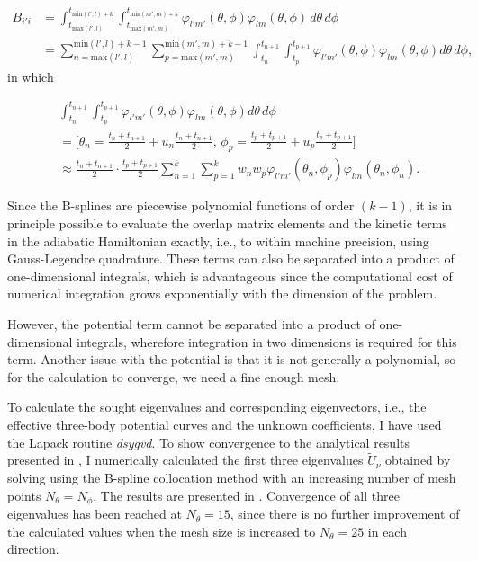 \begin{equation}
\begin{aligned}
B_{i'i} &= \int_{t_{\text{max}(l',l)}}^{t_{\text{min}(l',l)+k}} \int_{t_{\text{max}(m',m)}}^{t_{\text{min}(m',m)+k}} \varphi_{l'm'}(\theta,\phi)\varphi_{lm}(\theta,\phi)\,d\theta\,d\phi \\
&= \sum_{n={\text{max}(l',l)}}^{\text{min}(l',l)+k-1} \sum_{p={\text{max}(m',m)}}^{\text{min}(m',m)+k-1} \int_{t_{n}}^{t_{n+1}} \int_{t_{p}}^{t_{p+1}} \varphi_{l'm'}(\theta,\phi) \varphi_{lm}(\theta,\phi) d\theta\,d\phi,
\end{aligned}
\end{equation}
in which

\begin{equation}
\begin{aligned}
&\int_{t_{n}}^{t_{n+1}} \int_{t_{p}}^{t_{p+1}} \varphi_{l'm'}(\theta,\phi) \varphi_{lm}(\theta,\phi) d\theta\,d\phi\,\\
&=\bigg[\theta_n = \frac{t_n + t_{n+1}}{2} + u_n\frac{t_n + t_{n+1}}{2}, \, \phi_p = \frac{t_p + t_{p+1}}{2} + u_p\frac{t_p + t_{p+1}}{2}\bigg]\\
&\approx \frac{t_n + t_{n+1}}{2} \cdot \frac{t_p + t_{p+1}}{2} \sum_{n=1}^{k}\sum_{p=1}^{k}w_n w_p \varphi_{l'm'}(\theta_n,\phi_p) \varphi_{lm}(\theta_n,\phi_n).
\end{aligned}
\end{equation}

Since the B-splines are piecewise polynomial functions of order $(k-1)$, it is in principle possible to evaluate the overlap matrix elements and the kinetic terms in the adiabatic Hamiltonian exactly, i.e., to within machine precision, using Gauss-Legendre quadrature. These terms can also be separated into a product of one-dimensional integrals, which is advantageous since the computational cost of numerical integration grows exponentially with the dimension of the problem.

However, the potential term cannot be separated into a product of one-dimensional integrals, wherefore integration in two dimensions is required for this term. Another issue with the potential is that it is not generally a polynomial, so for the calculation to converge, we need a fine enough mesh. 

To calculate the sought eigenvalues and corresponding eigenvectors, i.e., the effective three-body potential curves and the unknown coefficients, I have used the Lapack routine \textit{dsygvd}. To show convergence to the analytical results presented in , I numerically calculated the first three eigenvalues $\tilde{U}_{\nu}$ obtained by solving  using the B-spline collocation method with an increasing number of mesh points $N_{\theta}=N_{\phi}$. The results are presented in . Convergence of all three eigenvalues has been reached at $N_{\theta}=15$, since there is no further improvement of the calculated values when the mesh size is increased to $N_{\theta}=25$ in each direction.

